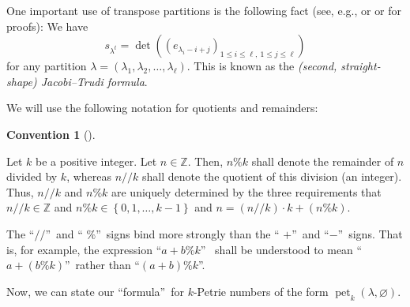 \documentclass[numbers=enddot,12pt,final,onecolumn,notitlepage]{scrartcl}%
\theoremstyle{definition}
\newtheorem{conv}[theo]{Convention}
\newenvironment{convention}[1][]
{\begin{conv}[#1]\begin{leftbar}}
{\end{leftbar}\end{conv}}
\begin{document}
One important use of transpose partitions is the following fact (see, e.g.,
\cite[(2.4.17) for $\mu=\varnothing$]{GriRei} or \cite[Theorem 2.32]{MenRem15}
or \cite[Theorem 7.16.2 applied to $\lambda^{t}$ and $\varnothing$ instead of
$\lambda$ and $\mu$]{Stanley-EC2} for proofs): We have%
\begin{equation}
s_{\lambda^{t}}=\det\left(  \left(  e_{\lambda_{i}-i+j}\right)  _{1\leq
i\leq\ell,\ 1\leq j\leq\ell}\right)  \label{eq.schur.JTsh-e}%
\end{equation}
for any partition $\lambda=\left(  \lambda_{1},\lambda_{2},\ldots
,\lambda_{\ell}\right)  $. This is known as the \emph{(second, straight-shape)
Jacobi--Trudi formula}.

We will use the following notation for quotients and remainders:

\begin{convention}
Let $k$ be a positive integer. Let $n\in\mathbb{Z}$. Then, $n\%k$ shall denote
the remainder of $n$ divided by $k$, whereas $n//k$ shall denote the quotient
of this division (an integer). Thus, $n//k$ and $n\%k$ are uniquely determined
by the three requirements that $n//k\in\mathbb{Z}$ and $n\%k\in\left\{
0,1,\ldots,k-1\right\}  $ and $n=\left(  n//k\right)  \cdot k+\left(
n\%k\right)  $.

The \textquotedblleft$//$\textquotedblright\ and \textquotedblleft%
$\%$\textquotedblright\ signs bind more strongly than the \textquotedblleft%
$+$\textquotedblright\ and \textquotedblleft$-$\textquotedblright\ signs. That
is, for example, the expression \textquotedblleft$a+b\%k$\textquotedblright%
\ shall be understood to mean \textquotedblleft$a+\left(  b\%k\right)
$\textquotedblright\ rather than \textquotedblleft$\left(  a+b\right)
\%k$\textquotedblright.
\end{convention}

Now, we can state our \textquotedblleft formula\textquotedblright\ for
$k$-Petrie numbers of the form $\operatorname*{pet}\nolimits_{k}\left(
\lambda,\varnothing\right)  $.
\end{document}
